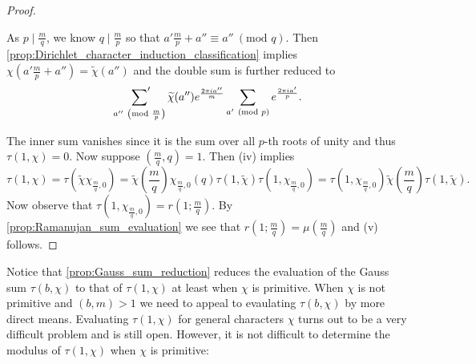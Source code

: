 \documentclass[12pt]{book}
\theoremstyle{definition}\newframedtheorem{method}{Method}
\newcommand{\psum}{\sideset{}{'}\sum}
\newcommand{\tmod}[1]{\ \left(\text{mod }#1\right)}
\newcommand{\<}{\langle}
\renewcommand{\>}{\rangle}
\newcommand{\wtilde}{\widetilde}
\begin{document}
\begin{proof}
\begin{enumerate}[label=(\roman*)]
\[          \]
          As $p \mid \frac{m}{q}$, we know $q \mid \frac{m}{p}$ so that $a'\frac{m}{p}+a'' \equiv a'' \tmod{q}$. Then \cref{prop:Dirichlet_character_induction_classification} implies $\chi\left(a'\frac{m}{p}+a''\right) = \wtilde{\chi}(a'')$ and the double sum is further reduced to
          \[
            \psum_{a'' \tmod{\frac{m}{p}}}\wtilde{\chi}(a'')e^{\frac{2\pi ia''}{m}}\sum_{a' \tmod{p}}e^{\frac{2\pi ia'}{p}}.
          \]
        \end{enumerate}
        The inner sum vanishes since it is the sum over all $p$-th roots of unity and thus $\tau(1,\chi) = 0$. Now suppose $\left(\frac{m}{q},q\right) = 1$. Then (iv) implies
        \[
          \tau(1,\chi) = \tau(\wtilde{\chi}\chi_{\frac{m}{q},0}) = \wtilde{\chi}\left(\frac{m}{q}\right)\chi_{\frac{m}{q},0}(q)\tau(1,\wtilde{\chi})\tau(1,\chi_{\frac{m}{q},0}) = \tau(1,\chi_{\frac{m}{q},0})\wtilde{\chi}\left(\frac{m}{q}\right)\tau(1,\wtilde{\chi}).
        \]
        Now observe that $\tau(1,\chi_{\frac{m}{q},0}) = r\left(1;\frac{m}{q}\right)$. By \cref{prop:Ramanujan_sum_evaluation} we see that $r\left(1;\frac{m}{q}\right) = \mu\left(\frac{m}{q}\right)$ and (v) follows.
      \end{proof}

      Notice that \cref{prop:Gauss_sum_reduction} reduces the evaluation of the Gauss sum $\tau(b,\chi)$ to that of $\tau(1,\chi)$ at least when $\chi$ is primitive. When $\chi$ is not primitive and $(b,m) > 1$ we need to appeal to evaulating $\tau(b,\chi)$ by more direct means. Evaluating $\tau(1,\chi)$ for general characters $\chi$ turns out to be a very difficult problem and is still open. However, it is not difficult to determine the modulus of $\tau(1,\chi)$ when $\chi$ is primitive:
\end{document}
